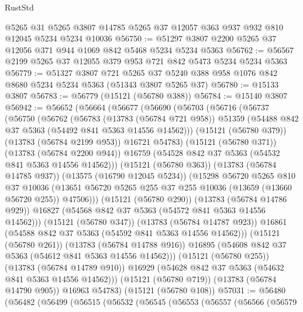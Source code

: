 \begin{lexlean}{RustStd}
\begin{coremodule}
    @5265
    @31
    @5265
    @3807
    @14785
    @5265
    @37
    @12057
    @363
    @937
    @932
    @810
    @12045
    @5234
    @5234
    @10036
@56750 := @51297 @3807 @2200 @5265 @37 @12056 @371 @944 @1069 @842 @5468 @5234 @5234 @5363
@56762 := @56567 @2199 @5265 @37 @12055 @379 @953 @721 @842 @5473 @5234 @5234 @5363
@56779 := @51327
    @3807
    @721
    @5265
    @37
    @5240
    @388
    @958
    @1076
    @842
    @8680
    @5234
    @5234
    @5363
    (@51343 @3807 @5265 @37)
@56780 := @15133 @3807
@56783 := @56779 (@15121 (@56780 @388))
@56784 := @15140 @3807
@56942 := @56652
    (@56664
      (@56677
        (@56690
          (@56703
            (@56716
              (@56737
                (@56750
                  (@56762
                    (@56783
                      (@13783 (@56784 @721 @958))
                      @51359
                      (@54488 @842 @37 @5363 (@54492 @841 @5363 @14556 @14562)))
                    (@15121 (@56780 @379))
                    (@13783 (@56784 @2199 @953))
                    @16721
                    @54783)
                  (@15121 (@56780 @371))
                  (@13783 (@56784 @2200 @944))
                  @16759
                  (@54528 @842 @37 @5363 (@54532 @841 @5363 @14556 @14562)))
                (@15121 (@56780 @363))
                (@13783 (@56784 @14785 @937))
                (@13575 (@16790 @12045 @5234))
                (@15298
                  @56720
                  @5265
                  @810
                  @37
                  @10036
                  (@13651 @56720 @5265 @255 @37 @255 @10036 (@13659 (@13660 @56720 @255)) @47506)))
              (@15121 (@56780 @290))
              (@13783 (@56784 @14786 @929))
              @16827
              (@54568 @842 @37 @5363 (@54572 @841 @5363 @14556 @14562)))
            (@15121 (@56780 @347))
            (@13783 (@56784 @14787 @923))
            @16861
            (@54588 @842 @37 @5363 (@54592 @841 @5363 @14556 @14562)))
          (@15121 (@56780 @261))
          (@13783 (@56784 @14788 @916))
          @16895
          (@54608 @842 @37 @5363 (@54612 @841 @5363 @14556 @14562)))
        (@15121 (@56780 @255))
        (@13783 (@56784 @14789 @910))
        @16929
        (@54628 @842 @37 @5363 (@54632 @841 @5363 @14556 @14562)))
      (@15121 (@56780 @719))
      (@13783 (@56784 @14790 @905))
      @16963
      @54783)
    (@15121 (@56780 @108))
@57031 := @56480
    (@56482
      (@56499
        (@56515
          (@56532
            (@56545
              (@56553
                (@56557
                  (@56566
                    (@56579

\end{coremodule}
\end{lexlean}
